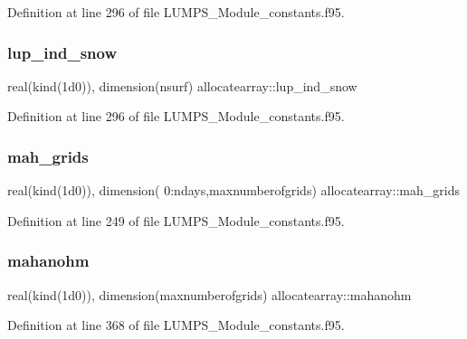 Definition at line 296 of file L\+U\+M\+P\+S\+\_\+\+Module\+\_\+constants.\+f95.

\mbox{\label{namespaceallocatearray_ac854cc7121610eee303aafda55092b55}} 
\subsubsection{\texorpdfstring{lup\+\_\+ind\+\_\+snow}{lup\_ind\_snow}}
{\footnotesize\ttfamily real(kind(1d0)), dimension(nsurf) allocatearray\+::lup\+\_\+ind\+\_\+snow}



Definition at line 296 of file L\+U\+M\+P\+S\+\_\+\+Module\+\_\+constants.\+f95.

\mbox{\label{namespaceallocatearray_a3726b9b257444736e7319b5fe72dbb90}} 
\subsubsection{\texorpdfstring{mah\+\_\+grids}{mah\_grids}}
{\footnotesize\ttfamily real(kind(1d0)), dimension( 0\+:ndays,maxnumberofgrids) allocatearray\+::mah\+\_\+grids}



Definition at line 249 of file L\+U\+M\+P\+S\+\_\+\+Module\+\_\+constants.\+f95.

\mbox{\label{namespaceallocatearray_afab50b58dfb4bad7d0078ba26cfabb41}} 
\subsubsection{\texorpdfstring{mahanohm}{mahanohm}}
{\footnotesize\ttfamily real(kind(1d0)), dimension(maxnumberofgrids) allocatearray\+::mahanohm}



Definition at line 368 of file L\+U\+M\+P\+S\+\_\+\+Module\+\_\+constants.\+f95.

\mbox{\label{namespaceallocatearray_aded55272c7c08e6a254c7a9d70546d69}} 
